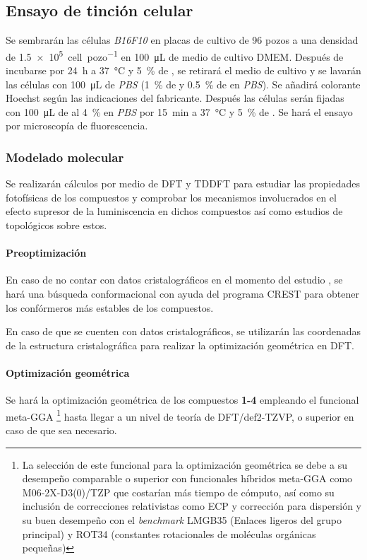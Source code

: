 \subsection{Ensayo de tinción celular}
Se sembrarán las células \emph{B16F10} en placas de cultivo de 96 pozos a una densidad de \qty{1.5e5}{{cell}\per{pozo}} en \qty{100}{\uL} de medio de cultivo DMEM. Después de incubarse por \qty{24}{\hour} a \qty{37}{\degreeCelsius} y \qty{5}{\percent} de , se retirará el medio de cultivo y se lavarán las células con \qty{100}{\uL} de \emph{PBS} (\qty{1}{\percent} de  y \qty{0.5}{\percent} de  en \emph{PBS}). Se añadirá colorante Hoechst según las indicaciones del fabricante. Después las células serán fijadas con \qty{100}{\uL} de  al \qty{4}{\percent} en \emph{PBS} por \qty{15}{\minute} a \qty{37}{\degreeCelsius} y \qty{5}{\percent} de . Se hará el ensayo por microscopía de fluorescencia.

\subsubsection{Modelado molecular}
Se realizarán cálculos \insilico{} por medio de \gls{DFT} y \gls{TDDFT} para estudiar las propiedades fotofísicas de los compuestos y comprobar los mecanismos involucrados en el efecto supresor de la luminiscencia en dichos compuestos así como estudios de topológicos sobre estos.

\paragraph{Preoptimización}
En caso de no contar con datos cristalográficos en el momento del estudio \insilico{}, se hará una búsqueda conformacional con ayuda del programa \gls{CREST} \cite{prachtAutomatedExplorationLowenergy2020} para obtener los confórmeros más estables de los compuestos.

En caso de que se cuenten con datos cristalográficos, se utilizarán las coordenadas de la estructura cristalográfica para realizar la optimización geométrica en DFT.

\paragraph{Optimización geométrica}
Se hará la optimización geométrica de los compuestos \textbf{1-4} empleando el funcional meta-GGA \scan{}\footnote{La selección de este funcional para la optimización geométrica se debe a su desempeño comparable o superior con funcionales híbridos meta-GGA como M06-2X-D3(0)/TZP que costarían más tiempo de cómputo, así como su inclusión de correcciones relativistas como ECP y corrección para dispersión y su buen desempeño con el \emph{benchmark} LMGB35 (Enlaces ligeros del grupo principal) y ROT34 (constantes rotacionales de moléculas orgánicas pequeñas)} \cite{gasevicOptimizationSCAN3cComposite2022} hasta llegar a un nivel de teoría de DFT/def2-TZVP, o superior en caso de que sea necesario.

